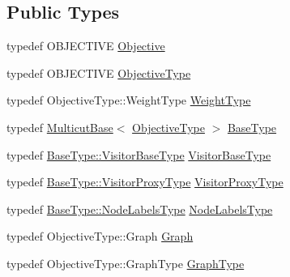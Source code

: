 \subsection*{Public Types}
\begin{DoxyCompactItemize}
\item 
typedef O\+B\+J\+E\+C\+T\+I\+V\+E \hyperlink{classnifty_1_1graph_1_1optimization_1_1multicut_1_1ChainedSolvers_a0b89fffeac7c1d2c8133f26a024af5a3}{Objective}
\item 
typedef O\+B\+J\+E\+C\+T\+I\+V\+E \hyperlink{classnifty_1_1graph_1_1optimization_1_1multicut_1_1ChainedSolvers_a4e09a9640880f957eee512e0d8a56c3e}{Objective\+Type}
\item 
typedef Objective\+Type\+::\+Weight\+Type \hyperlink{classnifty_1_1graph_1_1optimization_1_1multicut_1_1ChainedSolvers_a5ad84ddc6fe01fbae5a52afdaa03e572}{Weight\+Type}
\item 
typedef \hyperlink{classnifty_1_1graph_1_1optimization_1_1multicut_1_1MulticutBase}{Multicut\+Base}$<$ \hyperlink{classnifty_1_1graph_1_1optimization_1_1multicut_1_1ChainedSolvers_a4e09a9640880f957eee512e0d8a56c3e}{Objective\+Type} $>$ \hyperlink{classnifty_1_1graph_1_1optimization_1_1multicut_1_1ChainedSolvers_a3ada35119200b4ff4e1fc35383ecaa82}{Base\+Type}
\item 
typedef \hyperlink{classnifty_1_1graph_1_1optimization_1_1common_1_1SolverBase_a5a14d64c70a9cc0eebc7d71d2b089f9b}{Base\+Type\+::\+Visitor\+Base\+Type} \hyperlink{classnifty_1_1graph_1_1optimization_1_1multicut_1_1ChainedSolvers_a73196408ad592adcb3e3a89fef73fb69}{Visitor\+Base\+Type}
\item 
typedef \hyperlink{classnifty_1_1graph_1_1optimization_1_1common_1_1SolverBase_a58913ea9ab9232ff72608b710c1012d0}{Base\+Type\+::\+Visitor\+Proxy\+Type} \hyperlink{classnifty_1_1graph_1_1optimization_1_1multicut_1_1ChainedSolvers_abdaad4f08d245de900243682dd917596}{Visitor\+Proxy\+Type}
\item 
typedef \hyperlink{classnifty_1_1graph_1_1optimization_1_1common_1_1SolverBase_a6e4e465f3b6e039882669fcfb9714818}{Base\+Type\+::\+Node\+Labels\+Type} \hyperlink{classnifty_1_1graph_1_1optimization_1_1multicut_1_1ChainedSolvers_a259cf07811ed206783e18959da3351dd}{Node\+Labels\+Type}
\item 
typedef Objective\+Type\+::\+Graph \hyperlink{classnifty_1_1graph_1_1optimization_1_1multicut_1_1ChainedSolvers_ac4810a20516fc5ed80005b77930112df}{Graph}
\item 
typedef Objective\+Type\+::\+Graph\+Type \hyperlink{classnifty_1_1graph_1_1optimization_1_1multicut_1_1ChainedSolvers_ac2f6903706867e7dc2ed3465862bfb49}{Graph\+Type}

\end{DoxyCompactItemize}
